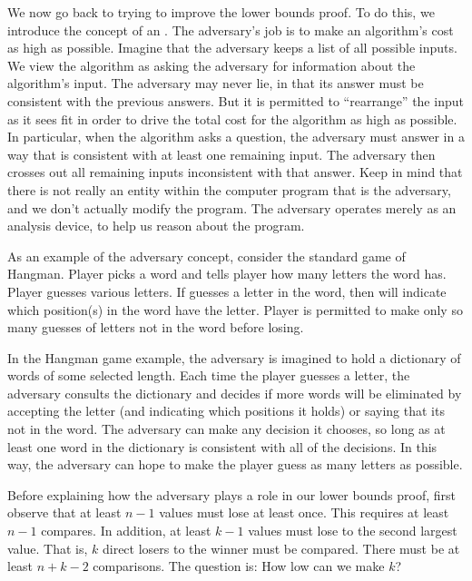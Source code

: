 We now go back to trying to improve the lower bounds proof.
To do this, we introduce the concept of an .
The adversary's job is to make an algorithm's cost as high as
possible.
Imagine that the adversary keeps a list of all possible inputs.
We view the algorithm as asking the adversary for information about
the algorithm's input.
The adversary may never lie, in that its answer must be consistent
with the previous answers.
But it is permitted to ``rearrange'' the input as it sees fit in order
to drive the total cost for the algorithm as high as possible.
In particular, when the algorithm asks a question, the adversary
must answer in a way that is consistent with at least one remaining
input.
The adversary then crosses out all remaining inputs inconsistent with
that answer.
Keep in mind that there is not really an entity within the computer
program that is the adversary, and we don't actually modify the
program.
The adversary operates merely as an analysis device, to help us reason
about the program.

As an example of the adversary concept, consider the standard game of
Hangman.
Player  picks a word and tells player  how many
letters the word has.
Player  guesses various letters.
If  guesses a letter in the word, then  will indicate
which position(s) in the word have the letter.
Player  is permitted to make only so many guesses of letters
not in the word before losing.

In the Hangman game example, the adversary is imagined to hold a
dictionary of words of some selected length.
Each time the player guesses a letter, the adversary consults the
dictionary and decides if more words will be eliminated by accepting
the letter (and indicating which positions it holds) or saying that
its not in the word.
The adversary can make any decision it chooses, so long as at least
one word in the dictionary is consistent with all of the decisions.
In this way, the adversary can hope to make the player guess as many
letters as possible.

Before explaining how the adversary plays a role in our lower bounds
proof, first observe that at least \(n-1\) values must lose at least
once.
This requires at least \(n-1\) compares.
In addition, at least \(k-1\) values must lose to the second largest
value.
That is, \(k\) direct losers to the winner must be compared.
There must be at least \(n + k - 2\) comparisons.
The question is: How low can we make \(k\)?


